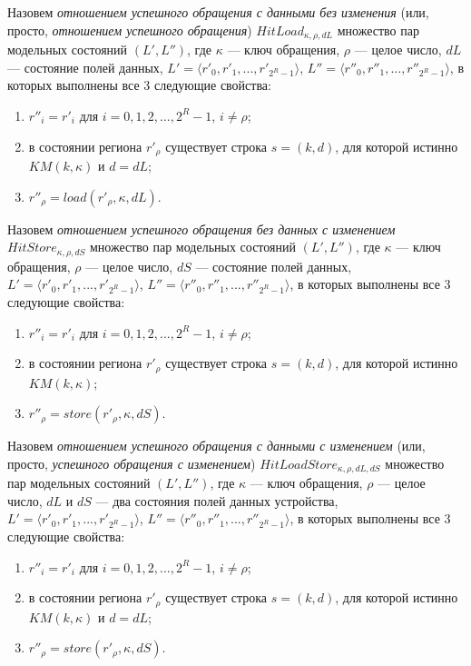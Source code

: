 Назовем \emph{отношением успешного обращения с данными без изменения} (или, просто, \emph{отношением успешного обращения}) $HitLoad_{\kappa, \rho, dL}$ множество пар модельных состояний $(L', L'')$, где $\kappa$ --- ключ обращения, $\rho$ --- целое число, $dL$ --- состояние полей данных, $L' = \langle r'_0, r'_1, ..., r'_{2^R-1} \rangle$, $L'' = \langle r''_0, r''_1, ..., r''_{2^R-1} \rangle$, в которых выполнены все 3 следующие свойства:
  \begin{enumerate}
    \item $r''_i = r'_i$ для $i = 0, 1, 2, ..., 2^R{-}1$, $i \neq \rho$;
    \item в состоянии региона $r'_{\rho}$ существует строка $s = (k,d)$, для которой истинно $KM(k, \kappa)$ и $d = dL$;
    \item $r''_{\rho} = load(r'_{\rho}, \kappa, dL)$.
  \end{enumerate}

Назовем \emph{отношением успешного обращения без данных с изменением}\\ $HitStore_{\kappa, \rho, dS}$ множество пар модельных состояний $(L', L'')$, где $\kappa$ --- ключ обращения, $\rho$ --- целое число, $dS$ --- состояние полей данных, $L' = \langle r'_0, r'_1, ..., r'_{2^R-1} \rangle$, $L'' = \langle r''_0, r''_1, ..., r''_{2^R-1} \rangle$, в которых выполнены все 3 следующие свойства:
  \begin{enumerate}
    \item $r''_i = r'_i$ для $i = 0, 1, 2, ..., 2^R{-}1$, $i \neq \rho$;
    \item в состоянии региона $r'_{\rho}$ существует строка $s = (k,d)$, для которой истинно $KM(k, \kappa)$;
    \item $r''_{\rho} = store(r'_{\rho}, \kappa, dS)$.
  \end{enumerate}

Назовем \emph{отношением успешного обращения с данными с изменением} (или, просто, \emph{успешного обращения с изменением}) $HitLoadStore_{\kappa, \rho, dL, dS}$ множество пар модельных состояний $(L', L'')$, где $\kappa$ --- ключ обращения, $\rho$ --- целое число, $dL$ и $dS$ --- два состояния полей данных устройства, $L' = \langle r'_0, r'_1, ..., r'_{2^R-1} \rangle$, $L'' = \langle r''_0, r''_1, ..., r''_{2^R-1} \rangle$, в которых выполнены все 3 следующие свойства:
  \begin{enumerate}
    \item $r''_i = r'_i$ для $i = 0, 1, 2, ..., 2^R{-}1$, $i \neq \rho$;
    \item в состоянии региона $r'_{\rho}$ существует строка $s = (k,d)$, для которой истинно $KM(k, \kappa)$ и $d = dL$;
    \item $r''_{\rho} = store(r'_{\rho}, \kappa, dS)$.
  \end{enumerate}

